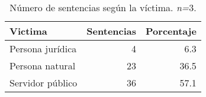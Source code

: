 \begin{table}[!htbp]
\centering
\caption{Número de sentencias según la víctima. \textit{n=}3.} 
\label{tab:victima}
\begin{tabular}{lrr}
  \hline
Victima & Sentencias & Porcentaje \\ 
  \hline
Persona jurídica &  4 & 6.3 \\ 
  Persona natural & 23 & 36.5 \\ 
  Servidor público & 36 & 57.1 \\ 
   \hline
\end{tabular}
\end{table}
